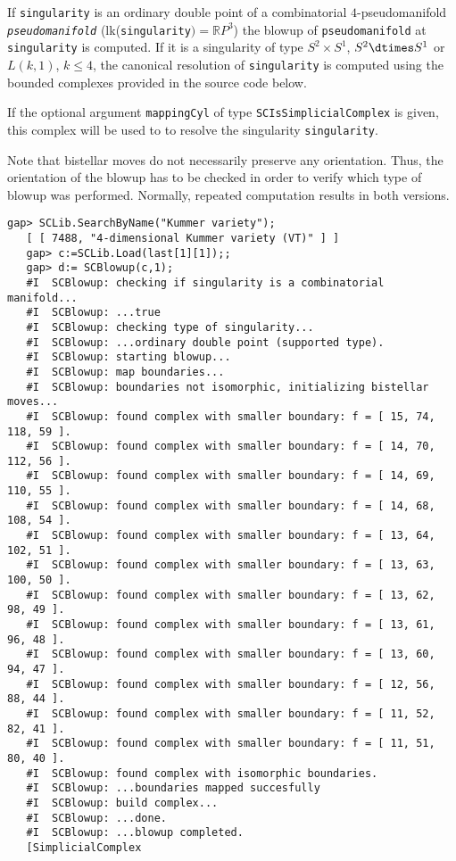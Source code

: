 \documentclass[a4paper,11pt]{report}
\begin{document}
{{{ If \texttt{singularity} is an ordinary double point of a combinatorial $4$-pseudomanifold \mbox{\texttt{\mdseries\slshape pseudomanifold}} (lk(\texttt{singularity}$) = \mathbb{R}P^3$) the blowup of \texttt{pseudomanifold} at \texttt{singularity} is computed. If it is a singularity of type $S^2 \times S^1$, $S^2 \dtimes S^1$ or $L(k,1)$, $k \leq 4$, the canonical resolution of \texttt{singularity} is computed using the bounded complexes provided in the source code below. 

 If the optional argument \texttt{mappingCyl} of type \texttt{SCIsSimplicialComplex} is given, this complex will be used to to resolve the singularity \texttt{singularity}.

 Note that bistellar moves do not necessarily preserve any orientation. Thus,
the orientation of the blowup has to be checked in order to verify which type
of blowup was performed. Normally, repeated computation results in both
versions. 
\begin{Verbatim}[commandchars=!@|,fontsize=\small,frame=single,label=Example]
   gap> SCLib.SearchByName("Kummer variety");
   [ [ 7488, "4-dimensional Kummer variety (VT)" ] ]
   gap> c:=SCLib.Load(last[1][1]);;                
   gap> d:= SCBlowup(c,1);
   #I  SCBlowup: checking if singularity is a combinatorial manifold...
   #I  SCBlowup: ...true
   #I  SCBlowup: checking type of singularity...
   #I  SCBlowup: ...ordinary double point (supported type).
   #I  SCBlowup: starting blowup...
   #I  SCBlowup: map boundaries...
   #I  SCBlowup: boundaries not isomorphic, initializing bistellar moves...
   #I  SCBlowup: found complex with smaller boundary: f = [ 15, 74, 118, 59 ].
   #I  SCBlowup: found complex with smaller boundary: f = [ 14, 70, 112, 56 ].
   #I  SCBlowup: found complex with smaller boundary: f = [ 14, 69, 110, 55 ].
   #I  SCBlowup: found complex with smaller boundary: f = [ 14, 68, 108, 54 ].
   #I  SCBlowup: found complex with smaller boundary: f = [ 13, 64, 102, 51 ].
   #I  SCBlowup: found complex with smaller boundary: f = [ 13, 63, 100, 50 ].
   #I  SCBlowup: found complex with smaller boundary: f = [ 13, 62, 98, 49 ].
   #I  SCBlowup: found complex with smaller boundary: f = [ 13, 61, 96, 48 ].
   #I  SCBlowup: found complex with smaller boundary: f = [ 13, 60, 94, 47 ].
   #I  SCBlowup: found complex with smaller boundary: f = [ 12, 56, 88, 44 ].
   #I  SCBlowup: found complex with smaller boundary: f = [ 11, 52, 82, 41 ].
   #I  SCBlowup: found complex with smaller boundary: f = [ 11, 51, 80, 40 ].
   #I  SCBlowup: found complex with isomorphic boundaries.
   #I  SCBlowup: ...boundaries mapped succesfully
   #I  SCBlowup: build complex...
   #I  SCBlowup: ...done.
   #I  SCBlowup: ...blowup completed.
   [SimplicialComplex
   

\end{Verbatim}}}}
\end{document}
